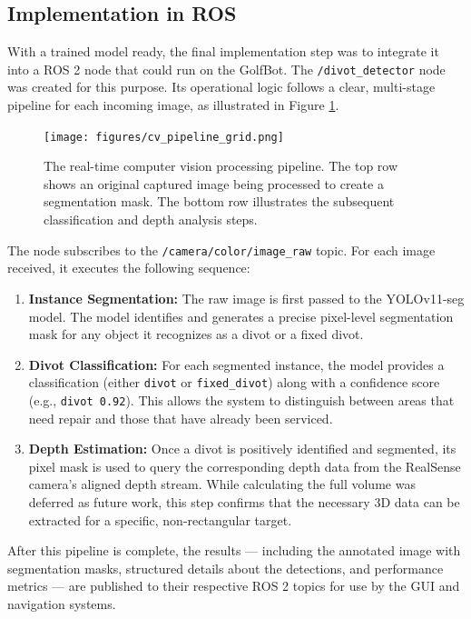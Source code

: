 \subsection{Implementation in ROS}
\label{ssec:cv_ros_implementation}
With a trained model ready, the final implementation step was to integrate it into a ROS 2 node that could run on the GolfBot. The \texttt{/divot\_detector} node was created for this purpose. Its operational logic follows a clear, multi-stage pipeline for each incoming image, as illustrated in Figure \ref{fig:cv_processing_pipeline}.

\begin{figure}[h!]
    \centering
    \texttt{[image: figures/cv\_pipeline\_grid.png]}
    \caption{The real-time computer vision processing pipeline. The top row shows an original captured image being processed to create a segmentation mask. The bottom row illustrates the subsequent classification and depth analysis steps.}
    \label{fig:cv_processing_pipeline}
\end{figure}

The node subscribes to the \texttt{/camera/color/image\_raw} topic. For each image received, it executes the following sequence:

\begin{enumerate}
    \item \textbf{Instance Segmentation:} The raw image is first passed to the YOLOv11-seg model. The model identifies and generates a precise pixel-level segmentation mask for any object it recognizes as a divot or a fixed divot.

    \item \textbf{Divot Classification:} For each segmented instance, the model provides a classification (either \texttt{divot} or \texttt{fixed\_divot}) along with a confidence score (e.g., \texttt{divot 0.92}). This allows the system to distinguish between areas that need repair and those that have already been serviced.

    \item \textbf{Depth Estimation:} Once a divot is positively identified and segmented, its pixel mask is used to query the corresponding depth data from the RealSense camera's aligned depth stream. While calculating the full volume was deferred as future work, this step confirms that the necessary 3D data can be extracted for a specific, non-rectangular target.
\end{enumerate}

After this pipeline is complete, the results — including the annotated image with segmentation masks, structured details about the detections, and performance metrics — are published to their respective ROS 2 topics for use by the GUI and navigation systems.

